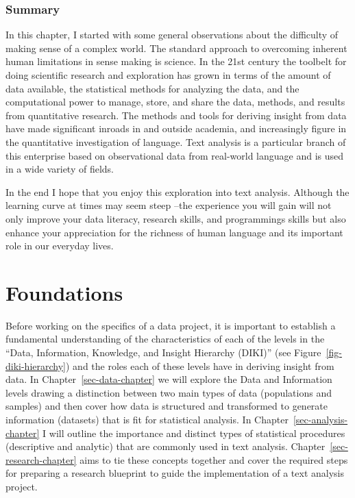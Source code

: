 \documentclass[
  letterpaper,
]{latex/krantz}
\theoremstyle{definition}
\theoremstyle{remark}
\begin{document}
\section*{Summary}\label{summary}


In this chapter, I started with some general observations about the
difficulty of making sense of a complex world. The standard approach to
overcoming inherent human limitations in sense making is science. In the
21st century the toolbelt for doing scientific research and exploration
has grown in terms of the amount of data available, the statistical
methods for analyzing the data, and the computational power to manage,
store, and share the data, methods, and results from quantitative
research. The methods and tools for deriving insight from data have made
significant inroads in and outside academia, and increasingly figure in
the quantitative investigation of language. Text analysis is a
particular branch of this enterprise based on observational data from
real-world language and is used in a wide variety of fields.

In the end I hope that you enjoy this exploration into text analysis.
Although the learning curve at times may seem steep --the experience you
will gain will not only improve your data literacy, research skills, and
programmings skills but also enhance your appreciation for the richness
of human language and its important role in our everyday lives.

\part{Foundations}

Before working on the specifics of a data project, it is important to
establish a fundamental understanding of the characteristics of each of
the levels in the ``Data, Information, Knowledge, and Insight Hierarchy
(DIKI)'' (see Figure~\ref{fig-diki-hierarchy}) and the roles each of
these levels have in deriving insight from data. In
Chapter~\ref{sec-data-chapter} we will explore the Data and Information
levels drawing a distinction between two main types of data (populations
and samples) and then cover how data is structured and transformed to
generate information (datasets) that is fit for statistical analysis. In
Chapter~\ref{sec-analysis-chapter} I will outline the importance and
distinct types of statistical procedures (descriptive and analytic) that
are commonly used in text analysis. Chapter~\ref{sec-research-chapter}
aims to tie these concepts together and cover the required steps for
preparing a research blueprint to guide the implementation of a text
analysis project.
\end{document}

